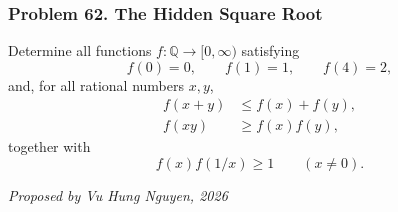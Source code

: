\subsubsection*{Problem 62. The Hidden Square Root}

\begin{exercisebox}[hard]

Determine all functions $f:\mathbb Q\to[0,\infty)$ satisfying
\[
f(0)=0,\qquad f(1)=1,\qquad f(4)=2,
\]
and, for all rational numbers $x,y$,
\[
\boxed{
\begin{aligned}
f(x+y)&\le f(x)+f(y),\\
f(xy)&\ge f(x)f(y),
\end{aligned}}
\]
together with
\[
\boxed{\qquad
f(x)f(1/x)\ge1
\qquad(x\ne0).
\qquad}
\]

\begin{flushright}
\textit{Proposed by Vu Hung Nguyen, 2026}
\end{flushright}


\end{exercisebox}
